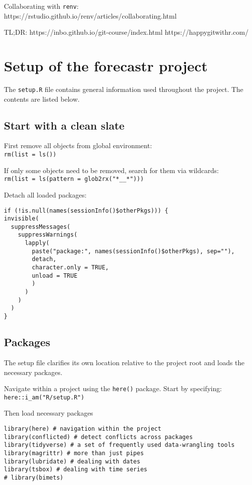 \documentclass[
  letterpaper,
  DIV=11,
  numbers=noendperiod]{scrreport}
\begin{document}
Collaborating with \texttt{renv}:
https://rstudio.github.io/renv/articles/collaborating.html

TL;DR: https://inbo.github.io/git-course/index.html
https://happygitwithr.com/


\chapter{Setup of the forecastr
project}\label{setup-of-the-forecastr-project}

The \texttt{setup.R} file contains general information used throughout
the project. The contents are listed below.

\section{Start with a clean slate}\label{start-with-a-clean-slate}

First remove all objects from global environment:\\
\texttt{rm(list\ =\ ls())}

If only some objects need to be removed, search for them via
wildcards:\\
\texttt{rm(list\ =\ ls(pattern\ =\ glob2rx("*\_\_*")))}

Detach all loaded packages:

\begin{verbatim}
if (!is.null(names(sessionInfo()$otherPkgs))) {
invisible(
  suppressMessages(
    suppressWarnings(
      lapply(
        paste("package:", names(sessionInfo()$otherPkgs), sep=""), 
        detach, 
        character.only = TRUE, 
        unload = TRUE
        )
      )
    )
  )
}
\end{verbatim}

\section{Packages}\label{packages}

The setup file clarifies its own location relative to the project root
and loads the necessary packages.

Navigate within a project using the \texttt{here()} package. Start by
specifying:\\
\texttt{here::i\_am("R/setup.R")}

Then load necessary packages

\begin{verbatim}
library(here) # navigation within the project
library(conflicted) # detect conflicts across packages
library(tidyverse) # a set of frequently used data-wrangling tools
library(magrittr) # more than just pipes
library(lubridate) # dealing with dates
library(tsbox) # dealing with time series
# library(bimets)
\end{verbatim}
\end{document}
